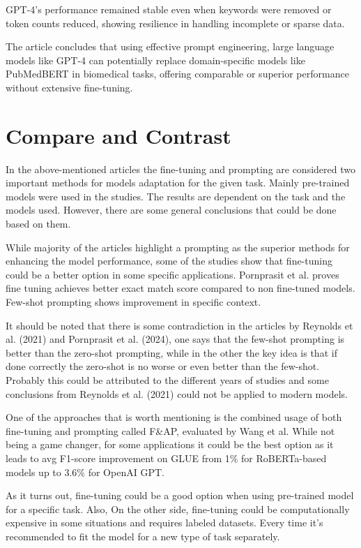 \documentclass[11pt]{article}
\begin{document}
GPT-4's performance remained stable even when keywords were removed or token counts reduced, showing resilience in handling incomplete or sparse data.

The article concludes that using effective prompt engineering, large language models like GPT-4 can potentially replace domain-specific models like PubMedBERT in biomedical tasks, offering comparable or superior performance without extensive fine-tuning.

\section{Compare and Contrast}

In the above-mentioned articles the fine-tuning and prompting are considered two important methods for models adaptation for the given task. Mainly pre-trained models were used in the studies. The results are dependent on the task and the models used. However, there are some general conclusions that could be done based on them.

While majority of the articles highlight a prompting as the superior methods for enhancing the model performance, some of the studies show that fine-tuning could be a better option in some specific applications. Pornprasit et al. proves fine tuning achieves better exact match score compared to non fine-tuned models. Few-shot prompting shows improvement in specific context.

It should be noted that there is some contradiction in the articles by Reynolds et al. (2021) and Pornprasit et al. (2024), one says that the few-shot prompting is better than the zero-shot prompting, while in the other the key idea is that if done correctly the zero-shot is no worse or even better than the few-shot. Probably this could be attributed to the different years of studies and some conclusions from Reynolds et al. (2021) could not be applied to modern models.

One of the approaches that is worth mentioning is the combined usage of both fine-tuning and prompting called F\&AP, evaluated by Wang et al. While not being a game changer, for some applications it could be the best option as it leads to avg F1-score improvement on GLUE from 1\% for RoBERTa-based models up to 3.6\% for OpenAI GPT.

As it turns out, fine-tuning could be a good option when using pre-trained model for a specific task. Also, On the other side, fine-tuning could be computationally expensive in some situations and requires labeled datasets. Every time it's recommended to fit the model for a new type of task separately.
\end{document}
